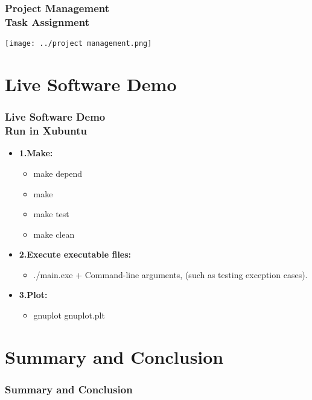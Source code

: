 \documentclass[ucs,10pt]{beamer}
\begin{document}
\begin{frame}
\frametitle{Project Management \\
    \small \color{rwth-blue} Task Assignment}
    
    \begin{flushleft}
        \texttt{[image: ../project management.png]}
    \end{flushleft}
\end{frame}



\section{Live Software Demo}

\begin{frame}
\frametitle{Live Software Demo \\
	\small \color{rwth-blue} Run in Xubuntu}
	\begin{itemize}	
            \item \textbf{1.Make:}
				\begin{itemize}
				\item make depend
				\item make
				\item make test
				\item make clean
				\end{itemize}
			\item \textbf{2.Execute executable files:}
				\begin{itemize}
				\item ./main.exe + Command-line arguments, (such as testing exception cases).
				\end{itemize}
			\item \textbf{3.Plot:}
				\begin{itemize}
				\item gnuplot gnuplot.plt
				\end{itemize}
	\end{itemize}
\end{frame}



\section{Summary and Conclusion}

\begin{frame}
\frametitle{Summary and Conclusion}
\end{frame}
\end{document}
